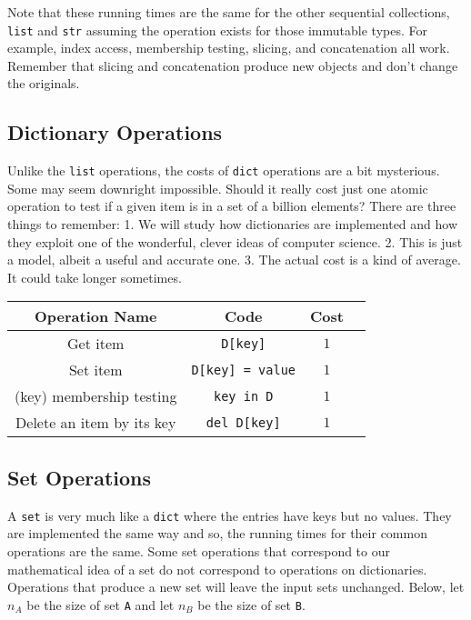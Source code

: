 Note that these running times are the same for the other sequential collections, \texttt{list} and \texttt{str} assuming the operation exists for those immutable types.
For example, index access, membership testing, slicing, and concatenation all work.
Remember that slicing and concatenation produce new objects and don't change the originals.

\subsection{Dictionary Operations}


Unlike the \texttt{list} operations, the costs of \texttt{dict} operations are a bit mysterious.
Some may seem downright impossible.
Should it really cost just one atomic operation to test if a given item is in a set of a billion elements?
There are three things to remember:
  1. We will study how dictionaries are implemented and how they exploit one of the wonderful, clever ideas of computer science.
  2. This is just a model, albeit a useful and accurate one.
  3. The actual cost is a kind of average.  It could take longer sometimes.

\begin{tabular}{c c c c}

\hline


Operation Name & 
Code & 
Cost & 
\\
\hline



Get item &
\texttt{D[key]} &
$1$ &
\\

Set item &
\texttt{D[key] = value} &
$1$ &
\\

(key) membership testing &
\texttt{key in D} &
$1$ &
\\

Delete an item by its key &
\texttt{del D[key]} &
$1$ &
\\
\hline
\end{tabular}
\subsection{Set Operations}


A \texttt{set} is very much like a \texttt{dict} where the entries have keys but no values.
They are implemented the same way and so, the running times for their common operations are the same.
Some set operations that correspond to our mathematical idea of a set do not correspond to operations on dictionaries.
Operations that produce a new set will leave the input sets unchanged.
Below, let $n_A$ be the size of set \texttt{A} and let $n_B$ be the size of set \texttt{B}.

